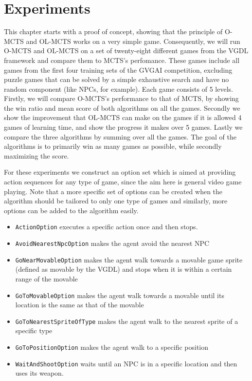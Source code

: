 \chapter{Experiments}
\label{sec:experiments}
This chapter starts with a proof of concept, showing that the principle of
O-MCTS and OL-MCTS works on a very simple game. Consequently, we will run O-MCTS
and OL-MCTS on a set of twenty-eight different games from the VGDL framework and
compare them to MCTS's perfomance.  These games include all games from the first
four training sets of the GVGAI competition, excluding puzzle games that can be
solved by a simple exhaustive search and have no random component (like NPCs,
for example). Each game consists of 5 levels. Firstly, we will compare O-MCTS's
performance to that of MCTS, by showing the win ratio and mean score of both
algorithms on all the games.  Secondly we show the improvement that OL-MCTS can
make on the games if it is allowed 4 games of learning time, and show the
progress it makes over 5 games.  Lastly we compare the three algorithms by
summing over all the games.  The goal of the algorithms is to primarily win as
many games as possible, while secondly maximizing the score. 

For these experiments we construct an option set which is aimed at providing
action sequences for any type of game, since the aim here is general video game
playing. Note that a more specific set of options can be created when the
algorithm should be tailored to only one type of games and similarly, more
options can be added to the algorithm easily.

\begin{itemize}[noitemsep]
	\item \texttt{ActionOption} executes a specific action once and then
		stops.
	\item \texttt{AvoidNearestNpcOption} makes the agent avoid the nearest NPC
	\item \texttt{GoNearMovableOption} makes the agent walk towards a
		movable game sprite (defined as movable by the VGDL) and stops when it
		is within a certain range of the movable
	\item \texttt{GoToMovableOption} makes the agent walk towards a
		movable until its location is the same as that of the movable
	\item \texttt{GoToNearestSpriteOfType} makes the agent walk to the nearest sprite of
		a specific type
	\item \texttt{GoToPositionOption} makes the agent walk to a specific position
	\item \texttt{WaitAndShootOption} waits until an NPC is in a specific location and
		then uses its weapon.
\end{itemize}

